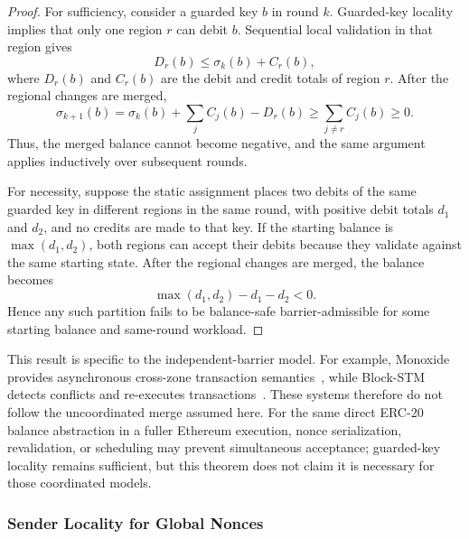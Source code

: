 \documentclass[runningheads]{llncs}
\begin{document}
\begin{proof}
For sufficiency, consider a guarded key $b$ in round $k$. Guarded-key locality
implies that only one region $r$ can debit $b$. Sequential local validation in
that region gives
\[
D_r(b)\leq \sigma_k(b)+C_r(b),
\]
where $D_r(b)$ and $C_r(b)$ are the debit and credit totals of region $r$.
After the regional changes are merged,
\[
\sigma_{k+1}(b)
=\sigma_k(b)+\sum_j C_j(b)-D_r(b)
\geq \sum_{j\neq r}C_j(b)\geq0.
\]
Thus, the merged balance cannot become negative, and the same argument applies
inductively over subsequent rounds.

For necessity, suppose the static assignment places two debits of the same
guarded key in different regions in the same round, with
positive debit totals $d_1$ and $d_2$, and no credits are made to that key. If
the starting balance is $\max(d_1,d_2)$, both regions can accept their debits
because they validate against the same starting state. After the regional
changes are merged, the balance becomes
\[
\max(d_1,d_2)-d_1-d_2<0.
\]
Hence any such partition fails to be balance-safe barrier-admissible for some
starting balance and same-round workload.
\end{proof}

This result is specific to the independent-barrier model. For example,
Monoxide provides asynchronous cross-zone transaction
semantics~\cite{monoxide2019}, while Block-STM detects conflicts and
re-executes transactions~\cite{gelashvili2023}. These systems therefore do not
follow the uncoordinated merge assumed here. For the same direct ERC-20 balance
abstraction in a fuller Ethereum execution,
nonce serialization, revalidation, or scheduling may prevent simultaneous
acceptance; guarded-key locality remains sufficient, but this theorem does not
claim it is necessary for those coordinated models.

\subsubsection{Sender Locality for Global Nonces}
\end{document}

